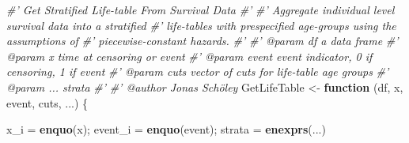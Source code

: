 \documentclass[10pt,twoside,reqno]{article}
\newenvironment{Shaded}{}{}
\newcommand{\CommentTok}[1]{\textit{#1}}
\newcommand{\ControlFlowTok}[1]{\textbf{#1}}
\newcommand{\KeywordTok}[1]{\textbf{#1}}
\newcommand{\NormalTok}[1]{#1}
\newcommand{\StringTok}[1]{#1}
\begin{document}
  \begin{Shaded}
  \begin{Highlighting}[]
  \CommentTok{#' Get Stratified Life-table From Survival Data}
  \CommentTok{#'}
  \CommentTok{#' Aggregate individual level survival data into a stratified}
  \CommentTok{#' life-tables with prespecified age-groups using the assumptions of}
  \CommentTok{#' piecewise-constant hazards.}
  \CommentTok{#'}
  \CommentTok{#' @param df a data frame}
  \CommentTok{#' @param x time at censoring or event}
  \CommentTok{#' @param event event indicator, 0 if censoring, 1 if event}
  \CommentTok{#' @param cuts vector of cuts for life-table age groups}
  \CommentTok{#' @param ... strata}
  \CommentTok{#'}
  \CommentTok{#' @author Jonas Schöley}
  \NormalTok{GetLifeTable <-}\StringTok{ }\ControlFlowTok{function}\NormalTok{ (df, x, event, cuts, ...) \{}
  
  \NormalTok{  x_i =}\StringTok{ }\KeywordTok{enquo}\NormalTok{(x); event_i =}\StringTok{ }\KeywordTok{enquo}\NormalTok{(event); strata =}\StringTok{ }\KeywordTok{enexprs}\NormalTok{(...)}
  

\end{Highlighting}
\end{Shaded}
\end{document}
